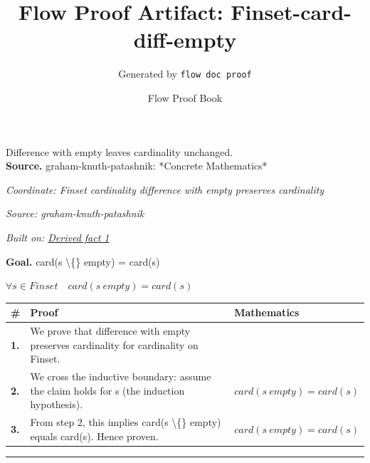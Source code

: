 \documentclass[11pt]{article}
\title{Flow Proof Artifact: Finset-card-diff-empty}
\author{Generated by \texttt{flow doc proof}}
\date{Flow Proof Book}
\theoremstyle{definition}
\begin{document}
\maketitle
Difference with empty leaves cardinality unchanged.\\[0.5em]
\textbf{Source.} graham-knuth-patashnik: *Concrete Mathematics*\\[0.5em]
\bigskip
{}\par
\smallskip\noindent\textit{Coordinate: Finset \cdot cardinality \cdot difference with empty preserves cardinality}\par
\smallskip\noindent\textit{Source: graham-knuth-patashnik}\par
\smallskip\noindent\textit{Built on: \hyperref[thm:Finset-cardinality-difference_with_empty_preserves_cardinality]{Derived fact 1}}\par
\medskip
\noindent\textbf{Goal.} card(s \textbackslash\{\} empty) = card(s)\par
\noindent$\displaystyle \forall s \in Finset\quad card(s \ empty) = card(s)$\par
\medskip
\noindent
\begin{tabular}{@{} >{\raggedright\arraybackslash}p{} >{\raggedright\arraybackslash}p{} >{\raggedleft\arraybackslash}p{} @{}}
\textbf{\#} & \textbf{Proof} & \textbf{Mathematics} \\
\midrule
\textbf{1.} & We prove that difference with empty preserves cardinality for cardinality on Finset. & \\[0.45em]
\textbf{2.} & We cross the inductive boundary: assume the claim holds for s (the induction hypothesis). & $\displaystyle card(s \ empty) = card(s)$ \\[0.45em]
\textbf{3.} & From step 2, this implies card(s \textbackslash\{\} empty) equals card(s). Hence proven. & $\displaystyle card(s \ empty) = card(s)$ \\[0.45em]
\bottomrule
\end{tabular}
\label{thm:Finset-cardinality-difference_with_empty_preserves_cardinality}
\par\medskip\hrule
\end{document}
